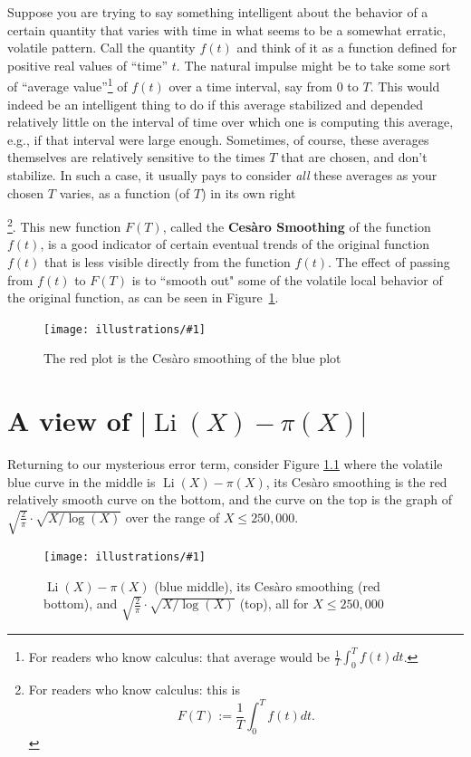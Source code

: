 \documentclass[openany]{book}
\DeclareMathOperator{\Li}{Li}
\newcommand{\ill}[3]{%
   \begin{figure}[H]%
   \vspace{-2ex}
   \centering%
   \texttt{[image: illustrations/\#1]}%
   \caption{#3}%
   \vspace{-2ex}
    \end{figure}}
\theoremstyle{plain}
\theoremstyle{definition}
\begin{document}
 Suppose you are trying to say something intelligent about the behavior of a certain quantity that varies with time in what seems to be a somewhat erratic, volatile pattern. Call the quantity $f(t)$ and think of it as a function defined for positive real values of ``time'' $t$.  The natural impulse might be to take some sort of ``average value''\footnote{For readers who know calculus: that  average would be ${\frac{1}{T}}\int_0^Tf(t)dt$.} of  $f(t)$ over a time interval, say from $0$ to $T$.   This would indeed be an intelligent thing to do if this average stabilized and depended relatively little on  the interval of time over which one is computing this average, e.g., if that interval were large enough.  Sometimes, of course, these averages themselves are relatively sensitive to the times $T$ that are chosen, and don't stabilize. In such a case, it usually pays to consider {\it all} these averages  as  your chosen $T$ varies, as a function (of $T$) in its own right{\footnote{ For readers who know calculus: this is
  $$F(T):= {\frac{1}{T}}\int_0^Tf(t)dt.$$}.
   This new function $F(T)$, called the {\bf Ces\`aro Smoothing} of the function $f(t)$, is a good indicator of certain eventual trends of the original function $f(t)$ that is less visible directly from the function $f(t)$.  The effect of passing from $f(t)$ to $F(T)$ is to ``smooth out" some of the volatile local behavior of the original function, as can be seen in
Figure~\ref{fig:cesaro-smoothing}.


\ill{cesaro}{.9}{The red plot is the Ces\`aro smoothing\index{Ces\`aro Smoothing} of the blue plot\label{fig:cesaro-smoothing}}
\chapter{ A view of $|\Li(X) - \pi(X)|$}
 Returning to our mysterious error term,  consider Figure \ref{fig:li-minus-pi-250000} where the volatile blue curve in the middle
 is $\Li(X) - \pi(X)$, its Ces\`aro smoothing is the red relatively smooth curve on the bottom, and the curve on the top
 is the graph of $\sqrt{\frac{2}{\pi}}\cdot \sqrt{X/\log(X)}$ over the range of $X\le 250{,}000$.

\ill{li-minus-pi-250000}{.9}{$\Li(X)-\pi(X)$ (blue middle), its Ces\`aro smoothing\index{Ces\`aro Smoothing} (red bottom), and
$\sqrt{\frac{2}{\pi}}\cdot \sqrt{X/\log(X)}$ (top), all for $X\leq 250{,}000$\label{fig:li-minus-pi-250000}}

}
\end{document}

